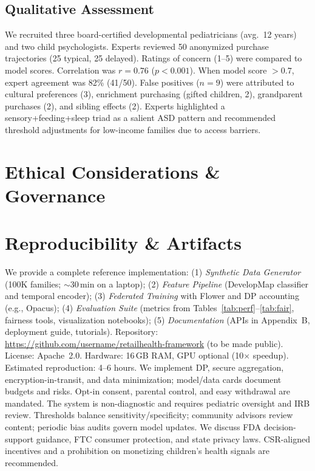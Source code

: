 \documentclass[conference]{IEEEtran}
\theoremstyle{plain}
\theoremstyle{remark}
\begin{document}
\subsection{Qualitative Assessment}
We recruited three board-certified developmental pediatricians (avg.\ 12 years) and two child psychologists. Experts reviewed 50 anonymized purchase trajectories (25 typical, 25 delayed). Ratings of concern (1--5) were compared to model scores. Correlation was $r=0.76$ ($p{<}0.001$). When model score $>{}0.7$, expert agreement was 82\% (41/50). False positives ($n{=}9$) were attributed to cultural preferences (3), enrichment purchasing (gifted children, 2), grandparent purchases (2), and sibling effects (2). Experts highlighted a sensory+feeding+sleep triad as a salient ASD pattern and recommended threshold adjustments for low-income families due to access barriers.

\section{Ethical Considerations \& Governance}
\section{Reproducibility \& Artifacts}\label{sec:repro}
We provide a complete reference implementation: (1) \emph{Synthetic Data Generator} (100K families; $\sim$30\,min on a laptop); (2) \emph{Feature Pipeline} (DevelopMap classifier and temporal encoder); (3) \emph{Federated Training} with Flower and DP accounting (e.g., Opacus); (4) \emph{Evaluation Suite} (metrics from Tables~\ref{tab:perf}--\ref{tab:fair}, fairness tools, visualization notebooks); (5) \emph{Documentation} (APIs in Appendix~B, deployment guide, tutorials). Repository: \url{https://github.com/username/retailhealth-framework} (to be made public). License: Apache~2.0. Hardware: 16\,GB RAM, GPU optional (10$\times$ speedup). Estimated reproduction: 4--6 hours.
\label{sec:ethics}
We implement DP, secure aggregation, encryption-in-transit, and data minimization; model/data cards document budgets and risks. Opt-in consent, parental control, and easy withdrawal are mandated. The system is non-diagnostic and requires pediatric oversight and IRB review. Thresholds balance sensitivity/specificity; community advisors review content; periodic bias audits govern model updates. We discuss FDA decision-support guidance, FTC consumer protection, and state privacy laws. CSR-aligned incentives and a prohibition on monetizing children's health signals are recommended.
\end{document}
